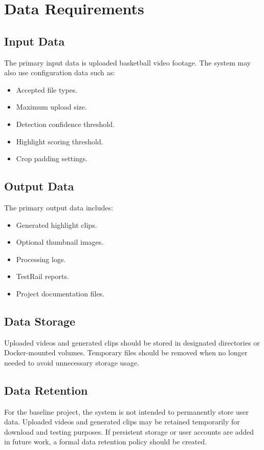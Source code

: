 \documentclass[12pt]{article}
\begin{document}
\newpage

\section{Data Requirements}

\subsection{Input Data}
The primary input data is uploaded basketball video footage. The system may also use configuration data such as:
\begin{itemize}[noitemsep]
    \item Accepted file types.
    \item Maximum upload size.
    \item Detection confidence threshold.
    \item Highlight scoring threshold.
    \item Crop padding settings.
\end{itemize}

\subsection{Output Data}
The primary output data includes:
\begin{itemize}[noitemsep]
    \item Generated highlight clips.
    \item Optional thumbnail images.
    \item Processing logs.
    \item TestRail reports.
    \item Project documentation files.
\end{itemize}

\subsection{Data Storage}
Uploaded videos and generated clips should be stored in designated directories or Docker-mounted volumes. Temporary files should be removed when no longer needed to avoid unnecessary storage usage.

\subsection{Data Retention}
For the baseline project, the system is not intended to permanently store user data. Uploaded videos and generated clips may be retained temporarily for download and testing purposes. If persistent storage or user accounts are added in future work, a formal data retention policy should be created.
\end{document}
